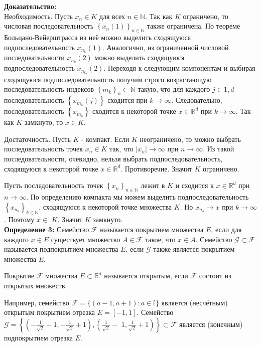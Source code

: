 \documentclass[a4paper,12pt]{article} %
\begin{document}
\textbf{Доказательство:}\\
Необходимость. Пусть $x_{n} \in K$ для всех $n \in \mathbb{N}$. Так как $K$ ограничено, то числовая последовательность $\left\{x_{n}(1)\right\}_{n \in \mathbb{N}}$ также ограничена. По теореме Больцано-Вейерштрасса из неё можно выделить сходящуюся подпоследовательность $x_{n_{k}}(1)$. Аналогично, из ограниченной числовой последовательности $x_{n_{k}}(2)$ можно выделить сходящуюся подпоследовательность $x_{n_{k_{\ell}}}(2)$. Переходя к следующим компонентам и выбирая сходящуюся подпоследовательность получим строго возрастающую последовательность индексов $\left\{m_{k}\right\}_{k} \subset \mathbb{N}$ такую, что для каждого $j \in \overline{1, d}$ последовательность $\left\{x_{m_{k}}(j)\right\}$ сходится при $k \rightarrow \infty$. Следовательно, последовательность $\left\{x_{m_{k}}\right\}$ сходится к некоторой точке $x \in \mathbb{R}^{d}$ при $k \rightarrow \infty$. Так как $K$ замкнуто, то $x \in K$.

Достаточность. Пусть $K$ - компакт. Если $K$ неограничено, то можно выбрать последовательность точек $x_{n} \in K$ так, что $\left|x_{n}\right| \rightarrow \infty$ при $n \rightarrow \infty$. Из такой последовательности, очевидно, нельзя выбрать подпоследовательность, сходящуюся к некоторой точке $x \in \mathbb{R}^{d}$. Противоречие. Значит $K$ ограничено.

Пусть последовательность точек $\left\{x_{n}\right\}_{n \in \mathbb{N}}$ лежит в $K$ и сходится к $x \in \mathbb{R}^{d}$ при $n \rightarrow \infty$. По определению компакта мы можем выделить подпоследовательность $\left\{x_{n_{k}}\right\}_{k \in \mathbb{N}}$, сходящуюся к некоторой точке множества $K$. Но $x_{n_{k}} \rightarrow x$ при $k \rightarrow \infty$. Поэтому $x \in$ $K$. Значит $K$ замкнуто.\\ \textbf{Определение 3:} Семейство $\mathscr{F}$ называется покрытием множества $E$, если для каждого $x \in E$ существует множество $A \in \mathscr{F}$ такое, что $x \in A$. Семейство $\mathscr{G} \subset \mathscr{F}$ называется подпокрытием множества $E$, если $\mathscr{G}$ также является покрытием множества $E$.

Покрытие $\mathscr{F}$ множества $E \subset \mathbb{R}^{d}$ называется открытым, если $\mathscr{F}$ состоит из открытых множеств.

Например, семейство $\mathscr{F}=\{(a-1, a+1): a \in \mathbb{I}\}$ является (несчётным) открытым покрытием отрезка $E=[-1,1]$. Семейство $\mathscr{G}=\left\{\left(-\frac{1}{\sqrt{2}}-1,-\frac{1}{\sqrt{2}}+1\right),\left(\frac{1}{\sqrt{2}}-\right.\right.$ $\left.\left.1, \frac{1}{\sqrt{2}}+1\right)\right\} \subset \mathscr{F}$ является (конечным) подпокрытием отрезка $E$.
\end{document}
